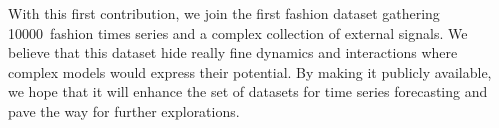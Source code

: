 \documentclass{article} %
\newcommand{\numberts}{10000}
\begin{document}
With this first contribution, we join the first fashion dataset gathering \numberts\ fashion times series and a complex collection of external signals. We believe that this dataset hide really fine dynamics and interactions where complex models would express their potential. By making it publicly available, we hope that it will enhance the set of datasets for time series forecasting and pave the way for further explorations.





\appendix

\end{document}
